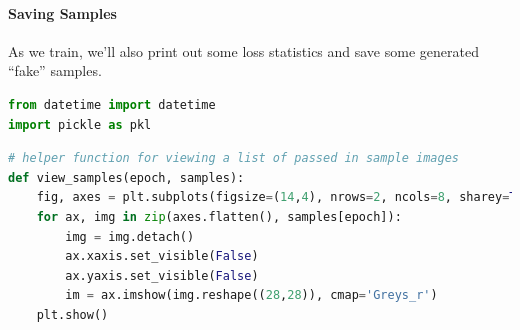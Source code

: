 \paragraph{Saving Samples}

As we train, we'll also print out some loss statistics and save some
generated ``fake'' samples.

\begin{lstlisting}[language=Python]
from datetime import datetime
import pickle as pkl
\end{lstlisting}

\begin{lstlisting}[language=Python]
# helper function for viewing a list of passed in sample images
def view_samples(epoch, samples):
    fig, axes = plt.subplots(figsize=(14,4), nrows=2, ncols=8, sharey=True, sharex=True)
    for ax, img in zip(axes.flatten(), samples[epoch]):
        img = img.detach()
        ax.xaxis.set_visible(False)
        ax.yaxis.set_visible(False)
        im = ax.imshow(img.reshape((28,28)), cmap='Greys_r')
    plt.show()
\end{lstlisting}

